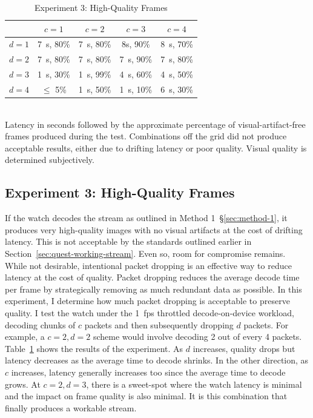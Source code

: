 \begin{table}
\centering
\begin{tabular}{|l|c|c|c|c|}
        \hline
        & $c = 1$ & $c = 2$ & $c = 3$ & $c = 4$ \\[0.1cm]
        \hline
$d = 1$ & 7~s, 80\% & 7~s, 80\%	& 8s, 90\%	& 8~s, 70\% \\[0.1cm]
\hline
$d = 2$ & 7~s, 80\% & 7~s, 80\% & 7~s, 90\%	& 7~s, 80\% \\[0.1cm]
\hline
$d = 3$ & 1~s, 30\% & \cellcolor{green!20}1~s, 99\%	& 4~s, 60\% & 4~s, 50\% \\[0.1cm]
\hline
$d = 4$ & $\leq$ 5\% & 1~s, 50\% &	1~s, 10\% & 6~s, 30\% \\[0.1cm]
\hline
\end{tabular}
    \begin{captext}
    \\[0.1cm] \small Latency in seconds followed by the approximate percentage of visual-artifact-free frames produced during the test. Combinations off the grid did not produce acceptable results, either due to drifting latency or poor quality. Visual quality is determined subjectively.
    \end{captext}
\caption{Experiment 3: High-Quality Frames}
\label{tab:hq-frames}
\end{table}

\subsection{Experiment 3: High-Quality Frames}
If the watch decodes the stream as outlined in Method 1~\S\ref{sec:method-1}, it produces very high-quality images with no visual artifacts at the cost of drifting latency. This is not acceptable by the standards outlined earlier in Section~\ref{sec:quest-working-stream}. Even so, room for compromise remains. While not desirable, intentional packet dropping is an effective way to reduce latency at the cost of quality. Packet dropping reduces the average decode time per frame by strategically removing as much redundant data as possible. In this experiment, I determine how much packet dropping is acceptable to preserve quality. I test the watch under the 1~fps throttled decode-on-device workload, decoding chunks of $c$ packets and then subsequently dropping $d$ packets. For example, a $c=2, d=2$ scheme would involve decoding 2 out of every 4 packets. Table~\ref{tab:hq-frames} shows the results of the experiment. As $d$ increases, quality drops but latency decreases as the average time to decode shrinks. In the other direction, as $c$ increases, latency generally increases too since the average time to decode grows. At $c=2, d=3$, there is a sweet-spot where the watch latency is minimal and the impact on frame quality is also minimal. It is this combination that finally produces a workable stream.

